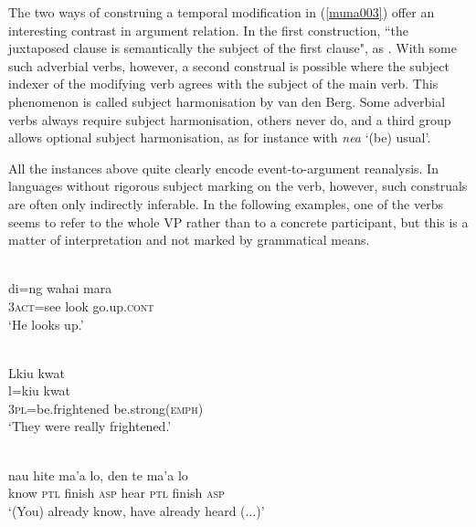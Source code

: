 The two ways of construing a temporal modification in (\ref{muna003}) offer an interesting contrast in argument relation. In the first construction, ``the juxtaposed clause is semantically the subject of the first clause", as \citet[236]{vandenberg1989}. With some such adverbial verbs, however, a second construal is possible where the subject indexer of the modifying verb agrees with the subject of the main verb. This phenomenon is called subject harmonisation by van den Berg. Some adverbial verbs always require subject harmonisation, others never do, and a third group allows optional subject harmonisation, as for instance with \textit{nea} `(be) usual'.

All the instances above quite clearly encode event-to-argument reanalysis. In languages without rigorous subject marking on the verb, however, such construals are often only indirectly inferable. In the following examples, one of the verbs seems to refer to the whole VP rather than to a concrete participant, but this is a matter of interpretation and not marked by grammatical means.

\ea \label{abui003}
\\
\gll di=ng wahai mara \\
3\textsc{act}=see look go.up.\textsc{cont} \\
\glft `He looks up.’\\ 
\z

\ea \label{}
\\
\glll Lkiu kwat \\
l=kiu kwat \\
3\textsc{pl}=be.frightened be.strong(\textsc{emph}) \\
\glft `They were really frightened.' \\ 
\z

\ea \label{waimaqa007}
\\
\gll nau hite ma'a lo, den te ma'a lo \\
know \textsc{ptl} finish \textsc{asp} hear \textsc{ptl} finish \textsc{asp} \\
\glft `(You) already know, have already heard (...)'\\ 
\z

